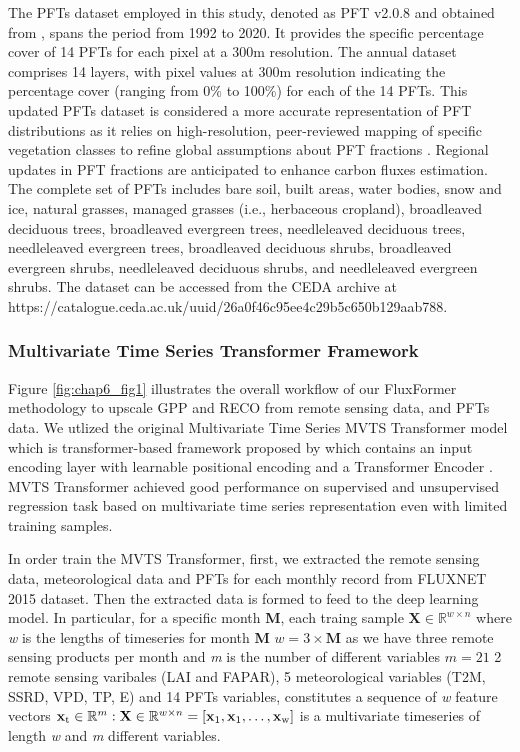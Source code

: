 The PFTs dataset employed in this study, denoted as PFT v2.0.8 and obtained from \citep{harper202229}, spans the period from 1992 to 2020. It provides the specific percentage cover of 14 PFTs for each pixel at a 300m resolution. The annual dataset comprises 14 layers, with pixel values at 300m resolution indicating the percentage cover (ranging from 0\% to 100\%) for each of the 14 PFTs. This updated PFTs dataset is considered a more accurate representation of PFT distributions as it relies on high-resolution, peer-reviewed mapping of specific vegetation classes to refine global assumptions about PFT fractions \citep{harper202229}. Regional updates in PFT fractions are anticipated to enhance carbon fluxes estimation. The complete set of PFTs includes bare soil, built areas, water bodies, snow and ice, natural grasses, managed grasses (i.e., herbaceous cropland), broadleaved deciduous trees, broadleaved evergreen trees, needleleaved deciduous trees, needleleaved evergreen trees, broadleaved deciduous shrubs, broadleaved evergreen shrubs, needleleaved deciduous shrubs, and needleleaved evergreen shrubs. The dataset can be accessed from the CEDA archive at https://catalogue.ceda.ac.uk/uuid/26a0f46c95ee4c29b5c650b129aab788.\par

\subsubsection{Multivariate Time Series Transformer Framework}
Figure \ref{fig:chap6_fig1} illustrates the overall workflow of our FluxFormer methodology to upscale GPP and RECO from remote sensing data, and PFTs data. We utlized the original Multivariate Time Series MVTS Transformer model which is transformer-based framework proposed by \citep{zerveas2021transformer} which contains an input encoding layer with learnable positional encoding and a Transformer Encoder \citep{vaswani2017attention}. MVTS Transformer achieved good performance on supervised and unsupervised regression task based on multivariate time series representation even with limited training samples.  \par
In order train the MVTS Transformer, first, we extracted the remote sensing data, meteorological data and PFTs for each monthly record from FLUXNET 2015 dataset. Then the extracted data is formed to feed to the deep learning model. In particular, for a specific month \textbf{M}, each traing sample $\mathbf{X} \in \mathbb{R}^{w\times n}$ where \textit{w} is the lengths of timeseries for month \textbf{M} $\textit{w} = 3\times \textbf{M}$ as we have three remote sensing products per month and \textit{m} is the number of different variables  $\textit{m} = 21$ 2 remote sensing varibales (LAI and FAPAR), 5 meteorological variables (T2M, SSRD, VPD, TP, E) and 14 PFTs variables, constitutes a sequence of \textit{w} feature vectors $\mathbf{x}\textsubscript{t} \in \mathbb{R}^{m}: \mathbf{X} \in \mathbb{R}^{w\times n} = [\mathbf{x}\textsubscript{1},\mathbf{x}\textsubscript{1}, \dots, \mathbf{x}\textsubscript{w}]$ is a multivariate timeseries of length \textit{w} and \textit{m} different variables. \par

